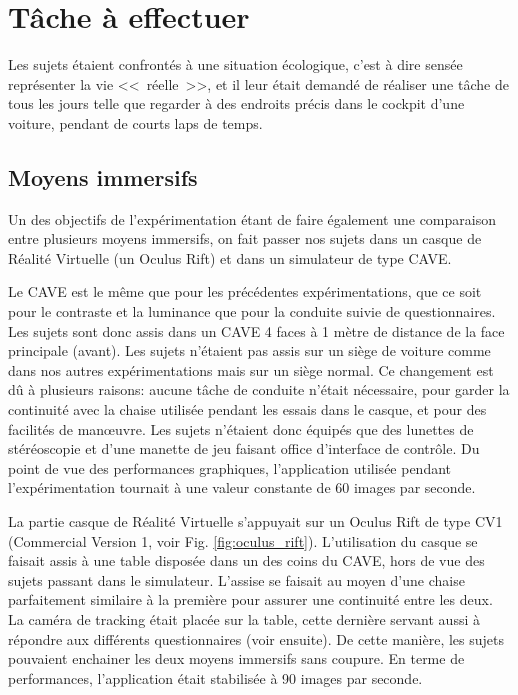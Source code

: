 	\section{Tâche à effectuer}
	\par Les sujets étaient confrontés à une situation écologique, c'est à dire sensée représenter la vie <<~réelle~>>, et il leur était demandé de réaliser une tâche de tous les jours telle que regarder à des endroits précis dans le cockpit d'une voiture, pendant de courts laps de temps.
	
	\subsection{Moyens immersifs}	
	\par Un des objectifs de l'expérimentation étant de faire également une comparaison entre plusieurs moyens immersifs,	on fait passer nos sujets dans un casque de Réalité Virtuelle (un Oculus Rift) et dans un simulateur de type CAVE.
	
	\par Le CAVE est le même que pour les précédentes expérimentations, que ce soit pour le contraste et la luminance que pour la conduite suivie de questionnaires. Les sujets sont donc assis dans un CAVE 4 faces à 1 mètre de distance de la face principale (avant). Les sujets n'étaient pas assis sur un siège de voiture comme dans nos autres expérimentations mais sur un siège normal. Ce changement est dû à plusieurs raisons: aucune tâche de conduite n'était nécessaire, pour garder la continuité avec la chaise utilisée pendant les essais dans le casque, et pour des facilités de manœuvre. Les sujets n'étaient donc équipés que des lunettes de stéréoscopie et d'une manette de jeu faisant office d'interface de contrôle. Du point de vue des performances graphiques, l'application utilisée pendant l'expérimentation tournait à une valeur constante de 60 images par seconde.
	
	\par La partie casque de Réalité Virtuelle s'appuyait sur un Oculus Rift de type CV1 (Commercial Version 1, voir Fig. \ref{fig:oculus_rift}). L'utilisation du casque se faisait assis à une table disposée dans un des coins du CAVE, hors de vue des sujets passant dans le simulateur. L'assise se faisait au moyen d'une chaise parfaitement similaire à la première pour assurer une continuité entre les deux. La caméra de tracking était placée sur la table, cette dernière servant aussi à répondre aux différents questionnaires (voir ensuite). De cette manière, les sujets pouvaient enchainer les deux moyens immersifs sans coupure. En terme de performances, l'application était stabilisée à 90 images par seconde.
	
